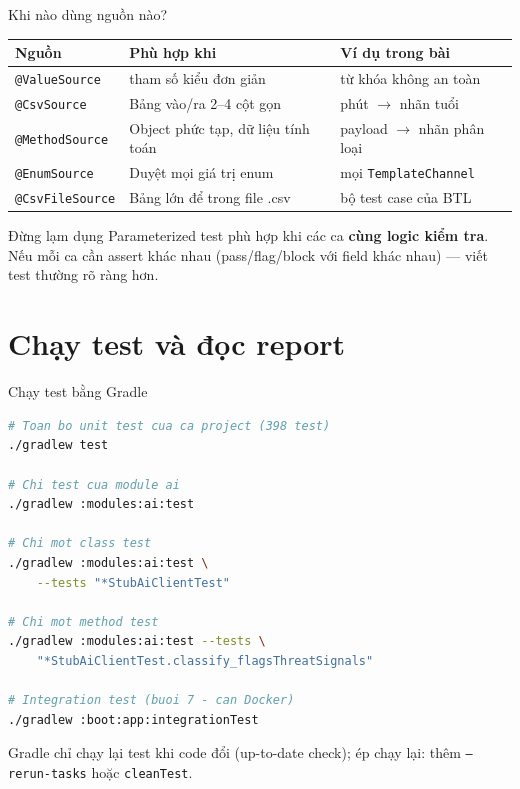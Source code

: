 \documentclass[aspectratio=169,12pt]{beamer}
\begin{document}
\begin{frame}{Khi nào dùng nguồn nào?}
  \renewcommand{\arraystretch}{1.2}
  \footnotesize
  \begin{tabularx}{\textwidth}{l>{\raggedright\arraybackslash}X>{\raggedright\arraybackslash}X}
    \toprule
    \textbf{Nguồn} & \textbf{Phù hợp khi} & \textbf{Ví dụ trong bài} \\
    \midrule
    \texttt{@ValueSource} & 1 tham số kiểu đơn giản & 4 từ khóa không an toàn \\
    \texttt{@CsvSource} & Bảng vào/ra 2--4 cột gọn & phút \(\to\) nhãn tuổi \\
    \texttt{@MethodSource} & Object phức tạp, dữ liệu tính toán & payload \(\to\) nhãn phân loại \\
    \texttt{@EnumSource} & Duyệt mọi giá trị enum & mọi \texttt{TemplateChannel} \\
    \texttt{@CsvFileSource} & Bảng lớn để trong file .csv & bộ test case của BTL \\
    \bottomrule
  \end{tabularx}
  \renewcommand{\arraystretch}{1}

  \vspace{0.5em}
  \begin{alertblock}{Đừng lạm dụng}
    Parameterized test phù hợp khi các ca \textbf{cùng logic kiểm tra}.
    Nếu mỗi ca cần assert khác nhau (pass/flag/block với field khác nhau)
    --- viết test thường rõ ràng hơn.
  \end{alertblock}
\end{frame}

\section{Chạy test và đọc report}

\begin{frame}[fragile,shrink=8]{Chạy test bằng Gradle}
\begin{lstlisting}[language=bash,style=nonumber]
# Toan bo unit test cua ca project (398 test)
./gradlew test

# Chi test cua module ai
./gradlew :modules:ai:test

# Chi mot class test
./gradlew :modules:ai:test \
    --tests "*StubAiClientTest"

# Chi mot method test
./gradlew :modules:ai:test --tests \
    "*StubAiClientTest.classify_flagsThreatSignals"

# Integration test (buoi 7 - can Docker)
./gradlew :boot:app:integrationTest
\end{lstlisting}
  \vspace{-0.2em}
  {\small Gradle chỉ chạy lại test khi code đổi (up-to-date check);
  ép chạy lại: thêm \texttt{--rerun-tasks} hoặc \texttt{cleanTest}.}
\end{frame}
\end{document}
